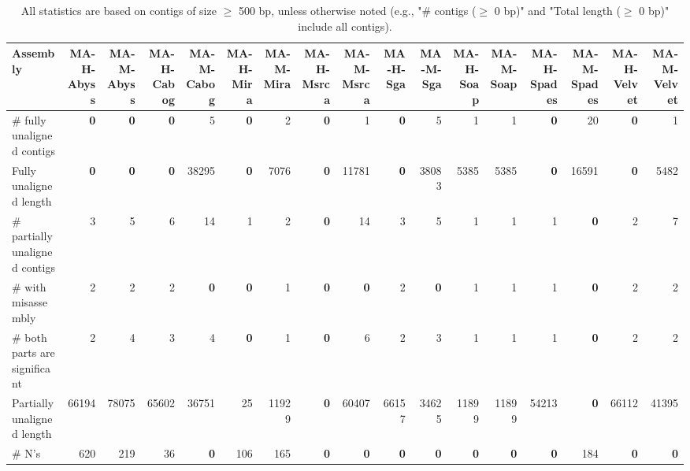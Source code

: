 \documentclass[12pt,a4paper]{article}
\begin{document}
\begin{table}[ht]
\begin{center}
\caption{All statistics are based on contigs of size $\geq$ 500 bp, unless otherwise noted (e.g., "\# contigs ($\geq$ 0 bp)" and "Total length ($\geq$ 0 bp)" include all contigs).}
\begin{tabular}{|l*{16}{|r}|}
\hline
Assembly & MA-H-Abyss & MA-M-Abyss & MA-H-Cabog & MA-M-Cabog & MA-H-Mira & MA-M-Mira & MA-H-Msrca & MA-M-Msrca & MA-H-Sga & MA-M-Sga & MA-H-Soap & MA-M-Soap & MA-H-Spades & MA-M-Spades & MA-H-Velvet & MA-M-Velvet \\ \hline
\# fully unaligned contigs & {\bf 0} & {\bf 0} & {\bf 0} & 5 & {\bf 0} & 2 & {\bf 0} & 1 & {\bf 0} & 5 & 1 & 1 & {\bf 0} & 20 & {\bf 0} & 1 \\ \hline
Fully unaligned length & {\bf 0} & {\bf 0} & {\bf 0} & 38295 & {\bf 0} & 7076 & {\bf 0} & 11781 & {\bf 0} & 38083 & 5385 & 5385 & {\bf 0} & 16591 & {\bf 0} & 5482 \\ \hline
\# partially unaligned contigs & 3 & 5 & 6 & 14 & 1 & 2 & {\bf 0} & 14 & 3 & 5 & 1 & 1 & 1 & {\bf 0} & 2 & 7 \\ \hline
\hspace{5mm}\# with misassembly & 2 & 2 & 2 & {\bf 0} & {\bf 0} & 1 & {\bf 0} & {\bf 0} & 2 & {\bf 0} & 1 & 1 & 1 & {\bf 0} & 2 & 2 \\ \hline
\hspace{5mm}\# both parts are significant & 2 & 4 & 3 & 4 & {\bf 0} & 1 & {\bf 0} & 6 & 2 & 3 & 1 & 1 & 1 & {\bf 0} & 2 & 2 \\ \hline
Partially unaligned length & 66194 & 78075 & 65602 & 36751 & 25 & 11929 & {\bf 0} & 60407 & 66157 & 34625 & 11899 & 11899 & 54213 & {\bf 0} & 66112 & 41395 \\ \hline
\# N's & 620 & 219 & 36 & {\bf 0} & 106 & 165 & {\bf 0} & {\bf 0} & {\bf 0} & {\bf 0} & {\bf 0} & {\bf 0} & {\bf 0} & 184 & {\bf 0} & {\bf 0} \\ \hline
\end{tabular}
\end{center}
\end{table}
\end{document}
